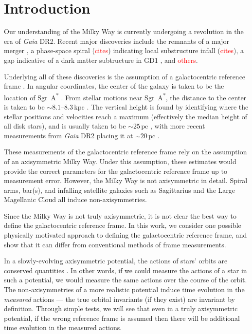 \documentclass[twocolumn]{aastex62}
\newcommand{\Gus}[1]{\textcolor{red}{#1}}
\newcommand{\pc}{\text{pc}}
\newcommand{\kpc}{\text{kpc}}
\begin{document}

\section{Introduction} \label{sec:intro}
Our understanding of the Milky Way is currently undergoing a revolution in the
era of {\em Gaia} DR2. Recent major discoveries include the remnants of a
major merger \citep{2018Natur.563...85H}, a phase-space spiral (\Gus{cites})
indicating local substructure infall (\Gus{cites}), a gap indicative of a dark
matter subtructure in GD1 \citep{2018arXiv181103631B}, and \Gus{others}.

Underlying all of these discoveries is the assumption of a galactocentric
reference frame \citep{2008gady.book.....B}. In angular
coordinates, the center of the galaxy is taken to be the location of
Sgr~A\textsuperscript{*} \citep[e.g.][]{2004ApJ...616..872R}. From stellar
motions near Sgr~A\textsuperscript{*}, the distance to the center is taken to
be $\sim 8.1\text{--}8.3\,\kpc$
\citep{2009ApJ...692.1075G,2018A&A...615L..15G}. The vertical height is found
by identifying where the stellar positions and velocities reach a maximum
(effectively the median height of all disk stars), and is usually taken to be
$\sim 25\,\pc$ \citep{2001ApJ...553..184C}, with more recent measurements from
{\em Gaia} DR2 placing it at $\sim 20\,\pc$ \citep{2019MNRAS.482.1417B}.

These measurements of the galactocentric reference frame rely on the
assumption of an axisymmetric Milky Way. Under this assumption, these
estimates would provide the correct parameters for the galactocentric
reference frame up to measurement error. However, the Milky Way is not
axisymmetric in detail. Spiral arms, bar(s), and infalling satellite galaxies
such as Sagittarius and the Large Magellanic Cloud all induce
non-axisymmetries.

Since the Milky Way is not truly axisymmetric, it is not clear the best way to
define the galactocentric reference frame. In this work, we consider one
possible physically motivated approach to defining the galactocentric
reference frame, and show that it can differ from conventional methods of
frame measurements.

In a slowly-evolving axisymmetric potential, the actions of stars' orbits are
conserved quantities \citep{2008gady.book.....B,2014RvMP...86....1S}. In other
words, if we could measure the actions of a star in such a potential, we would
measure the same actions over the course of the orbit. The non-axisymmetries
of a more realistic potential induce time evolution in the {\em measured}
actions --- the true orbital invariants (if they exist) are invariant by
definition. Through simple tests, we will see that even in a truly
axisymmetric potential, if the wrong reference frame is assumed then there
will be additional time evolution in the measured actions.
\end{document}

